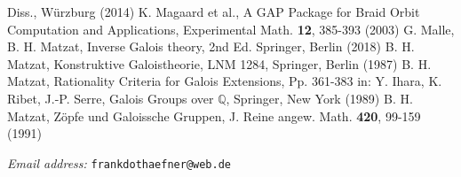 \documentclass[12pt,a4paper]{article}
\numberwithin{equation}{section}
\numberwithin{table}{section}
\begin{document}
\begin{thebibliography}{}
Diss., W\"urzburg (2014)
K. Magaard et al., A GAP Package for Braid Orbit Computation and Applications, Experimental Math. \textbf{12}, 385-393 (2003)
G. Malle, B. H. Matzat, Inverse Galois theory, 2nd Ed. Springer, Berlin (2018)
B. H. Matzat, Konstruktive Galoistheorie, LNM 1284, Springer, Berlin (1987)
B. H. Matzat, Rationality Criteria for Galois Extensions, Pp. 361-383 in:
Y. Ihara, K. Ribet, J.-P. Serre, Galois Groups over $\mathbb{Q}$, Springer, New York (1989)
B. H. Matzat, Z\"opfe und Galoissche Gruppen, J. Reine angew. Math. \textbf{420}, 99-159 (1991)
\end{thebibliography}
%
{\it Email address:} {\tt frankdothaefner@web.de}
%
\end{document}
